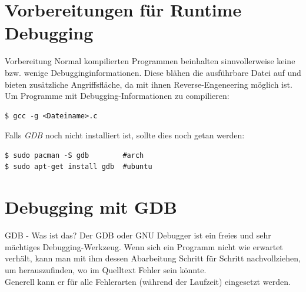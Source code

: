 \section{Vorbereitungen für Runtime Debugging}
\begin{frame}[fragile]{Vorbereitung}
	Normal kompilierten Programmen beinhalten sinnvollerweise keine bzw. wenige Debugginginformationen. Diese blähen die ausführbare Datei auf und bieten zusätzliche Angriffsfläche, da mit ihnen Reverse-Engeneering möglich ist.\\
	\bigskip
	Um Programme mit Debugging-Informationen zu compilieren:
		\begin{lstlisting}[numbers=none]
$ gcc -g <Dateiname>.c\end{lstlisting}
Falls \textit{GDB} noch nicht installiert ist, sollte dies noch getan werden:
		\begin{lstlisting}[numbers=none]
$ sudo pacman -S gdb        #arch
$ sudo apt-get install gdb  #ubuntu\end{lstlisting}

\end{frame}
\section{Debugging mit GDB}
\begin{frame}{GDB - Was ist das?}
Der GDB oder GNU Debugger ist ein freies und sehr mächtiges Debugging-Werkzeug. Wenn sich ein Programm nicht wie erwartet verhält, kann man mit ihm dessen Abarbeitung Schritt für Schritt nachvollziehen, um herauszufinden, wo im Quelltext Fehler sein könnte. \\
\bigskip
Generell kann er für alle Fehlerarten (während der Laufzeit) eingesetzt werden. 
\end{frame}

